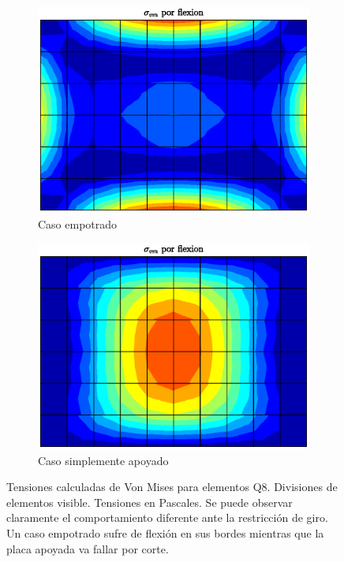 \documentclass[onecolumn,10pt,titlepage]{article}
\begin{document}
\begin{figure}[htb!]
 \centering
 \begin{subfigure}{0.49\textwidth}
 \includegraphics[width=\linewidth]{fig/VM.eps}
 \caption{Caso empotrado}
 \label{fig:VMempotrado}
 \end{subfigure}
 \begin{subfigure}{0.49\textwidth}
 \includegraphics[width=\linewidth]{fig/VMapoyado.eps}
 \caption{Caso simplemente apoyado}
 \label{fig:VMapoyado}
 \end{subfigure}
 \caption{Tensiones calculadas de Von Mises para elementos Q8. Divisiones de elementos visible. Tensiones en Pascales. Se puede observar claramente el comportamiento diferente ante la restricción de giro. Un caso empotrado sufre de flexión en sus bordes mientras que la placa apoyada va fallar por corte.}
 \label{fig:VM}
 \end{figure}
\end{document}
